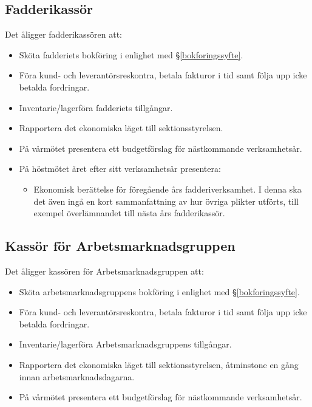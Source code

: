 \documentclass{datateknologsektionen-document}
\begin{document}
\subsection{Fadderikassör}
\label{fadderikassor}
Det åligger fadderikassören att:
\begin{itemize}
  \item Sköta fadderiets bokföring i enlighet med \S \ref{bokforingssyfte}.
  \item Föra kund- och leverantörsreskontra, betala fakturor i tid samt följa upp icke betalda fordringar.
  \item Inventarie/lagerföra fadderiets tillgångar.
  \item Rapportera det ekonomiska läget till sektionsstyrelsen.
  \item På vårmötet presentera ett budgetförslag för nästkommande verksamhetsår.
  \item På höstmötet året efter sitt verksamhetsår presentera:
        \begin{itemize}
          \item Ekonomisk berättelse för föregående års fadderiverksamhet. I denna ska det även ingå
                en kort sammanfattning av hur övriga plikter utförts, till exempel överlämnandet till
                nästa års fadderikassör.
        \end{itemize}
\end{itemize}

\subsection{Kassör för Arbetsmarknadsgruppen}
\label{amgkassor}
Det åligger kassören för Arbetsmarknadsgruppen att:
\begin{itemize}
  \item Sköta arbetsmarknadsgruppens bokföring i enlighet med \S \ref{bokforingssyfte}.
  \item Föra kund- och leverantörsreskontra, betala fakturor i tid samt följa upp icke betalda fordringar.
  \item Inventarie/lagerföra Arbetsmarknadsgruppens tillgångar.
  \item Rapportera det ekonomiska läget till sektionsstyrelsen, åtminstone en gång innan arbetsmarknadsdagarna.
  \item På vårmötet presentera ett budgetförslag för nästkommande verksamhetsår.
\end{itemize}
\end{document}
